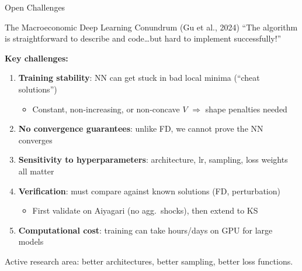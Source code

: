 \documentclass[aspectratio=169,11pt]{beamer}
\newcommand{\emphc}[1]{\textcolor{harvardcrimson}{#1}}
\begin{document}
\begin{frame}{Open Challenges}
\begin{alertblock}{The Macroeconomic Deep Learning Conundrum (Gu et al., 2024)}
\small
``The algorithm is straightforward to describe and code\ldots but hard to implement successfully!''
\end{alertblock}

\vspace{0.2em}
\small
\textbf{Key challenges:}
\begin{enumerate}\itemsep2pt
    \item \textbf{Training stability}: NN can get stuck in bad local minima (``cheat solutions'')
    \begin{itemize}\itemsep0pt
        \item Constant, non-increasing, or non-concave $V$ $\Rightarrow$ shape penalties needed
    \end{itemize}
    \item \textbf{No convergence guarantees}: unlike FD, we cannot prove the NN converges
    \item \textbf{Sensitivity to hyperparameters}: architecture, lr, sampling, loss weights all matter
    \item \textbf{Verification}: \emphc{must} compare against known solutions (FD, perturbation)
    \begin{itemize}\itemsep0pt
        \item First validate on Aiyagari (no agg.\ shocks), then extend to KS
    \end{itemize}
    \item \textbf{Computational cost}: training can take hours/days on GPU for large models
\end{enumerate}

\vspace{0.2em}
{\small Active research area: better architectures, better sampling, better loss functions.}
\end{frame}
\end{document}
